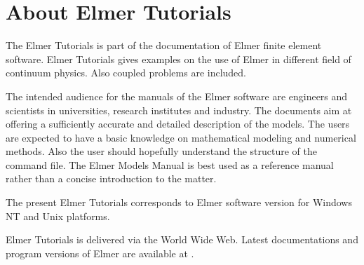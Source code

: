 \chapter*{About Elmer Tutorials}

The Elmer Tutorials is part of the documentation of 
Elmer finite element software.
Elmer Tutorials gives examples on the use of Elmer in different field
of continuum physics. Also coupled problems are included. 

The intended audience for the manuals of the Elmer software 
are engineers and
scientists in universities, research institutes and industry. The documents
aim at offering a sufficiently accurate and detailed description of 
the models. The users are expected to have a 
basic knowledge on mathematical modeling and numerical methods. 
Also the user should hopefully understand the structure of the command file.
The Elmer Models Manual is best used as a reference manual 
rather than a concise introduction to the matter. 

The present Elmer Tutorials 
corresponds to Elmer software version \elmerversion{} for 
Windows NT and Unix platforms. 

Elmer Tutorials is delivered via the World Wide Web.
Latest documentations and program versions of Elmer are available at 
. 


